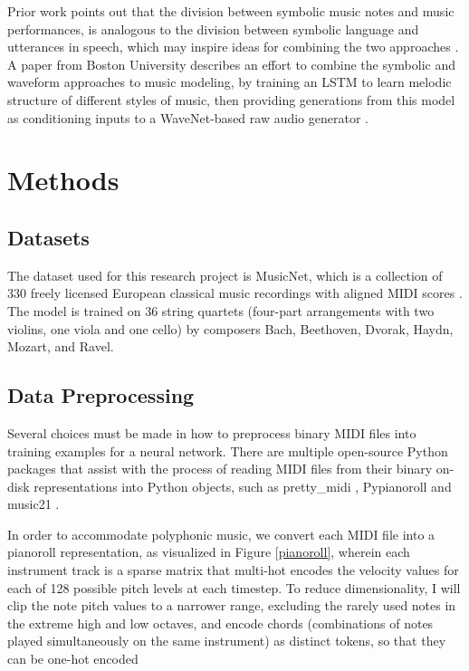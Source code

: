\documentclass[sigconf,authorversion]{acmart}
\begin{document}
Prior work points out that the division between symbolic music notes
and music performances, is analogous to the division between symbolic
language and utterances in speech, which may inspire ideas for
combining the two approaches \cite{hawthorne2019enabling}. A paper
from Boston University describes an effort to combine the symbolic and
waveform approaches to music modeling, by training an LSTM to learn
melodic structure of different styles of music, then providing
generations from this model as conditioning inputs to a WaveNet-based
raw audio generator \cite{manzelli_conditioning_2018}.

\section{Methods}

\subsection{Datasets}

The dataset used for this research project is MusicNet, which is a
collection of 330 freely licensed European classical music recordings
with aligned MIDI scores \cite{thickstun2017learning}.  The model is
trained on 36 string quartets (four-part arrangements with two
violins, one viola and one cello) by composers Bach, Beethoven,
Dvorak, Haydn, Mozart, and Ravel.

\subsection{Data Preprocessing}

Several choices must be made in how to preprocess binary MIDI files
into training examples for a neural network. There are multiple
open-source Python packages that assist with the process of reading
MIDI files from their binary on-disk representations into Python
objects, such as pretty\_midi \cite{raffel_pretty_midi_2014},
Pypianoroll \cite{dong_pypianoroll_2018} and music21
\cite{cuthbert_music21_2010}.

In order to accommodate polyphonic music, we convert each MIDI file
into a pianoroll representation, as visualized in Figure
\ref{pianoroll}, wherein each instrument track is a sparse matrix that
multi-hot encodes the velocity values for each of 128 possible pitch
levels at each timestep. To reduce dimensionality, I will clip the
note pitch values to a narrower range, excluding the rarely used notes
in the extreme high and low octaves, and encode chords (combinations
of notes played simultaneously on the same instrument) as distinct
tokens, so that they can be one-hot encoded
\end{document}
